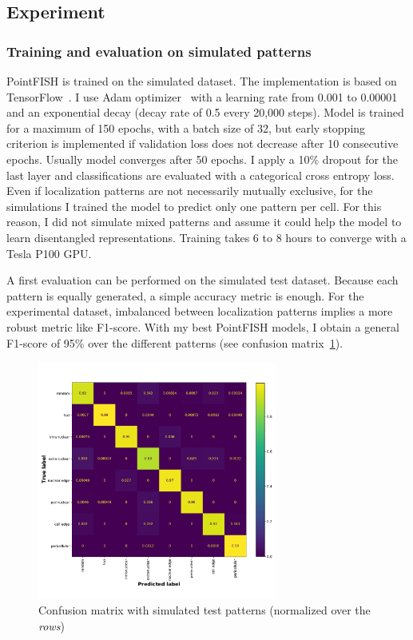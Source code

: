 \subsection{Experiment}
\label{subsec:experiment}

\subsubsection{Training and evaluation on simulated patterns}

PointFISH is trained on the simulated dataset.
The implementation is based on TensorFlow~\cite{tensorflow_2015}.
I use Adam optimizer~\cite{Diederik_2015} with a learning rate from 0.001 to 0.00001 and an exponential decay (decay rate of 0.5 every 20,000 steps).
Model is trained for a maximum of 150 epochs, with a batch size of 32, but early stopping criterion is implemented if validation loss does not decrease after 10 consecutive epochs.
Usually model converges after 50 epochs.
I apply a 10\% dropout for the last layer and classifications are evaluated with a categorical cross entropy loss.
Even if localization patterns are not necessarily mutually exclusive, for the simulations I trained the model to predict only one pattern per cell.
For this reason, I did not simulate mixed patterns and assume it could help the model to learn disentangled representations.
Training takes 6 to 8 hours to converge with a Tesla P100 GPU.

A first evaluation can be performed on the simulated test dataset.
Because each pattern is equally generated, a simple accuracy metric is enough.
For the experimental dataset, imbalanced between localization patterns implies a more robust metric like F1-score.
With my best PointFISH models, I obtain a general F1-score of 95\% over the different patterns (see confusion matrix~\ref{fig:confusion_matrix}).

\begin{figure}[]
    \centering
    \includegraphics[width=0.7\textwidth]{figures/chapter4/confusion_matrix}
    \caption[Confusion matrix with simulated test set]{Confusion matrix with simulated test patterns (normalized over the \textit{rows})}
    \label{fig:confusion_matrix}
\end{figure}

